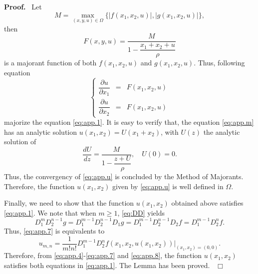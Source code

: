 \documentclass[preprint,12pt]{elsarticle}
\newenvironment{proof}[1][Proof]{\textbf{#1.}\ }{\ $\Box$}
\begin{document}
\begin{proof}
Let
$$M = \max_{(x,y,u)\in \Omega} \{|f(x_1,x_2,u)|, |g(x_1,x_2,u)|\}, $$
then 
\begin{equation}
F(x,y,u) = \dfrac{M}{1 -\dfrac{x_1+x_2 + u}{\rho}}
\end{equation}
is a majorant function of both $f(x_1,x_2,u)$ and $g(x_1,x_2,u)$.  Thus, following equation
\begin{equation}
\label{eq:app.m}
\left\{
\begin{array}{rcl}
\dfrac{\partial u}{\partial x_1} &=& F(x_1,x_2,u)\\
\dfrac{\partial u}{\partial x_2} &=& F(x_1,x_2,u)
\end{array}
\right.
\end{equation}
majorize the equation \eqref{eq:app.1}. It is easy to verify that, the equation \eqref{eq:app.m} has an analytic solution $u(x_1,x_2) = U(x_1+x_2)$, with $U(z)$ the analytic solution of 
\begin{equation}
\dfrac{d U}{d z} = \dfrac{M}{1 - \dfrac{z + U}{\rho}},\quad U(0) = 0.
\end{equation}
Thus, the convergency of \eqref{eq:app.u} is concluded by the Method of Majorants. Therefore, the function $u(x_1,x_2)$ given by \eqref{eq:app.u} is well defined in $\Omega$.

Finally, we need to show that the function $u(x_1,x_2)$ obtained above satisfies \eqref{eq:app.1}. 
We note that  when $m \geq 1$, \eqref{eq:DD} yields
$$D_1^m D_2^{n-1} g = D_1^{m-1} D_2^{n-1} D_1 g = D_1^{m-1} D_2^{n-1} D_2 f = D_1^{m-1} D_2^n f.$$
Thus, \eqref{eq:app.7} is equivalents to
\begin{equation}
\label{eq:app.8}
u_{m,n} = \dfrac{1}{m! n!} D_1^{m-1} D_2^{n} f(x_1,x_2,u(x_1,x_2))|_{(x_1,x_2) = (0,0)}.
\end{equation}
Therefore, from \eqref{eq:app.4}-\eqref{eq:app.7} and \eqref{eq:app.8}, the function $u(x_1,x_2)$ satisfies both equations in \ref{eq:app.1}. The Lemma has been proved.
\end{proof}


      
   
\end{document}
